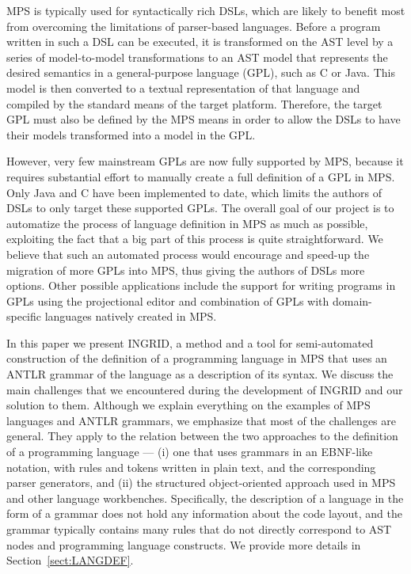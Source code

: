MPS is typically used for syntactically rich DSLs, which are likely to benefit most from overcoming the limitations of parser-based languages.
Before a program written in such a DSL can be executed, it is transformed on the AST level by a series of model-to-model transformations to an AST model that represents the desired semantics in a general-purpose language (GPL), such as C or Java.
This model is then converted to a textual representation of that language and compiled by the standard means of the target platform.
Therefore, the target GPL must also be defined by the MPS means in order to allow the DSLs to have their models transformed into a model in the GPL.

However, very few mainstream GPLs are now fully supported by MPS, because it requires substantial effort to manually create a full definition of a GPL in MPS.
Only Java and C have been implemented to date, which limits the authors of DSLs to only target these supported GPLs.
The overall goal of our project is to automatize the process of language definition in MPS as much as possible, exploiting the fact that a big part of this process is quite straightforward.
We believe that such an automated process would encourage and speed-up the migration of more GPLs into MPS, thus giving the authors of DSLs more options.
Other possible applications include the support for writing programs in GPLs using the projectional editor and combination of GPLs with domain-specific languages natively created in MPS.

In this paper we present INGRID, a method and a tool for semi-automated construction of the definition of a programming language in MPS that uses an ANTLR grammar of the language as a description of its syntax.
We discuss the main challenges that we encountered during the development of INGRID and our solution to them.
Although we explain everything on the examples of MPS languages and ANTLR grammars, we emphasize that most of the challenges are general. 
They apply to the relation between the two approaches to the definition of a programming language --- (i) one that uses grammars in an EBNF-like notation, with rules and tokens written in plain text, and the corresponding parser generators, and (ii) the structured object-oriented approach used in MPS and other language workbenches.
Specifically, the description of a language in the form of a grammar does not hold any information about the code layout, and the grammar typically contains many rules that do not directly correspond to AST nodes and programming language constructs.
We provide more details in Section~\ref{sect:LANGDEF}.

